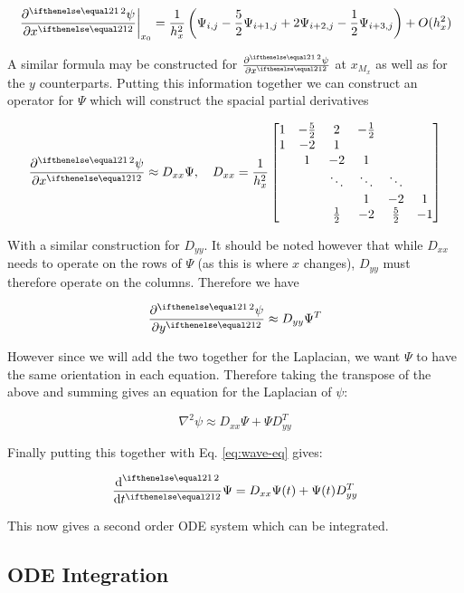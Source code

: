\documentclass{article}
\begin{document}
$$\left.\pder[2]{\psi}{x}\right|_{x_0} =
\frac{1}{h_x^2}\left(
\Psi_{i,j} - \frac{5}{2} \Psi_{i+1,j} +
2 \Psi_{i+2,j} - \frac{1}{2} \Psi_{i+3,j}\right) + O(h_x^2)$$

A similar formula may be constructed for $\pder[2]{\psi}{x}$ at $x_{M_x}$
as well as for the $y$ counterparts.  Putting this information together
we can construct an operator for $\Psi$ which will construct the spacial partial
derivatives

\begin{equation}
  \label{eq:differentiation-matrix}
  \pder[2]{\psi}{x} \approx D_{xx} \Psi, \quad D_{xx} = \frac{1}{h_x^2}
  \begin{bmatrix}
  1 & -\frac{5}{2} & 2 & -\frac{1}{2} \\
  1 & -2 & 1 \\
  & 1 & -2 & 1 \\
  & & \ddots & \ddots & \ddots \\
  & & & 1 & -2 & 1 \\
  & & \frac{1}{2} & -2 & \frac{5}{2} & -1 \end{bmatrix}
\end{equation}

With a similar construction for $D_{yy}$.  It should be noted however that
while $D_{xx}$ needs to operate on the rows of $\Psi$ (as this is where $x$
changes), $D_{yy}$ must therefore operate on the columns.  Therefore we have

$$\pder[2]{\psi}{y} \approx D_{yy} \Psi^T$$

However since we will add the two together for the Laplacian, we want $\Psi$ to
have the same orientation in each equation.  Therefore taking the
transpose of the above and summing gives an equation for the
Laplacian of $\psi$:

\begin{equation}
  \label{eq:discrete-laplacian}
  \nabla^2 \psi \approx D_{xx} \Psi + \Psi D_{yy}^T
\end{equation}

Finally putting this together with Eq. \ref{eq:wave-eq} gives:

\begin{equation}
  \label{eq:method-lines-ode}
  \der[2]{}{t} \Psi = D_{xx} \Psi(t) + \Psi(t) D_{yy}^T
\end{equation}

This now gives a second order ODE system which can be integrated.

\subsection{ODE Integration}
\end{document}
